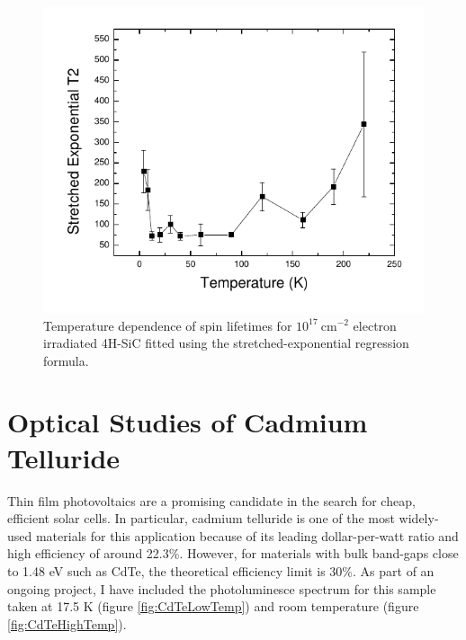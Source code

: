 \documentclass[oneside]{BYUPhys}
\begin{document}
\begin{appendices}
\begin{figure}
    \centerline{\includegraphics{e17-lifetimes-stretched}}
    \caption[Electron Irradiated SiC Temperature Dependence for Single-Exponential Spin Coherence]{\label{fig:SiCElectronSingle}
     Temperature dependence of spin lifetimes for $10^{17}~\text{cm}^{-2}$ electron irradiated 4H-SiC fitted using the stretched-exponential regression formula.}
 \end{figure}

\chapter{Optical Studies of Cadmium Telluride}
\label{sec:appendc}

Thin film photovoltaics are a promising candidate in the search for cheap, efficient solar cells.  In particular, cadmium telluride is one of the most widely-used materials for this application because of its leading dollar-per-watt ratio and high efficiency of around 22.3\%.  However, for materials with bulk band-gaps close to 1.48 eV such as CdTe, the theoretical efficiency limit is 30\%. As part of an ongoing project, I have included the photoluminesce spectrum for this sample taken at 17.5 K (figure \ref{fig:CdTeLowTemp}) and room temperature (figure \ref{fig:CdTeHighTemp}).


\end{appendices}
\end{document}
